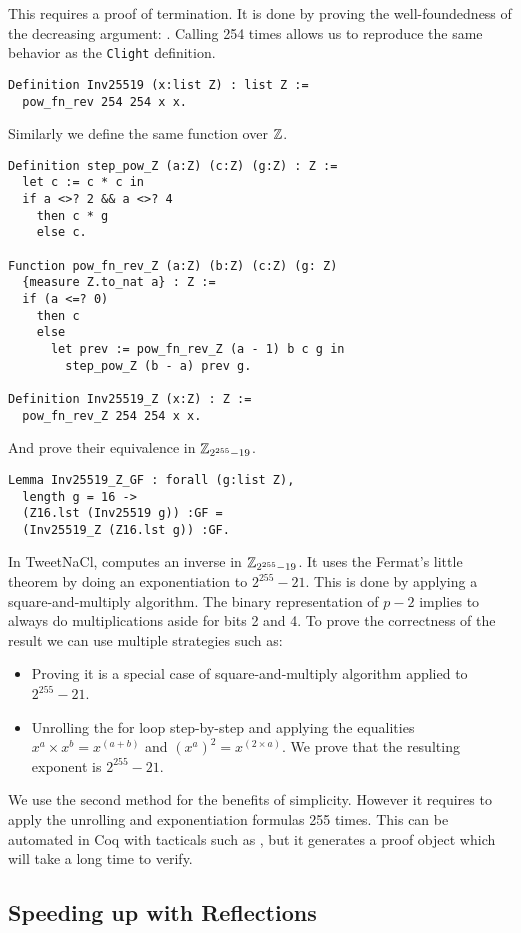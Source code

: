 This  requires a proof of termination. It is done by proving the
well-foundedness of the decreasing argument: . Calling
 254 times allows us to reproduce the same behavior as the \texttt{Clight} definition.
\begin{lstlisting}[language=Coq]
Definition Inv25519 (x:list Z) : list Z :=
  pow_fn_rev 254 254 x x.
\end{lstlisting}
Similarly we define the same function over $\mathbb{Z}$.
\begin{lstlisting}[language=Coq]
Definition step_pow_Z (a:Z) (c:Z) (g:Z) : Z :=
  let c := c * c in
  if a <>? 2 && a <>? 4
    then c * g
    else c.

Function pow_fn_rev_Z (a:Z) (b:Z) (c:Z) (g: Z)
  {measure Z.to_nat a} : Z :=
  if (a <=? 0)
    then c
    else
      let prev := pow_fn_rev_Z (a - 1) b c g in
        step_pow_Z (b - a) prev g.

Definition Inv25519_Z (x:Z) : Z :=
  pow_fn_rev_Z 254 254 x x.
\end{lstlisting}
And prove their equivalence in $\mathbb{Z}_{2^{255}-19}$.
\begin{lstlisting}[language=Coq]
Lemma Inv25519_Z_GF : forall (g:list Z),
  length g = 16 ->
  (Z16.lst (Inv25519 g)) :GF =
  (Inv25519_Z (Z16.lst g)) :GF.
\end{lstlisting}
In TweetNaCl,  computes an inverse in $\mathbb{Z}_{2^{255}-19}$.
It uses the Fermat's little theorem by doing an exponentiation to $2^{255}-21$.
This is done by applying a square-and-multiply algorithm. The binary representation
of $p-2$ implies to always do multiplications aside for bits 2 and 4.
To prove the correctness of the result we can use multiple strategies such as:
\begin{itemize}
  \item Proving it is a special case of square-and-multiply algorithm applied to $2^{255}-21$.
  \item Unrolling the for loop step-by-step and applying the equalities
  $x^a \times x^b = x^{(a+b)}$ and $(x^a)^2 = x^{(2 \times a)}$. We prove that
  the resulting exponent is $2^{255}-21$.
\end{itemize}
We use the second method for the benefits of simplicity. However it requires to
apply the unrolling and exponentiation formulas 255 times. This can be automated
in Coq with tacticals such as , but it generates a proof object which
will take a long time to verify.

\subsection{Speeding up with Reflections}


